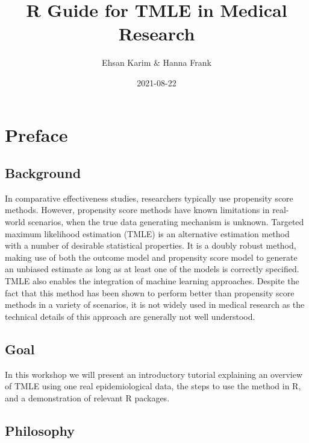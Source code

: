 \documentclass[
]{book}
\title{R Guide for TMLE in Medical Research}
\author{Ehsan Karim \& Hanna Frank}
\date{2021-08-22}
\begin{document}
\maketitle

{
\setcounter{tocdepth}{1}
\tableofcontents
}
\hypertarget{preface}{%
\chapter*{Preface}\label{preface}}

\hypertarget{background}{%
\section*{Background}\label{background}}

In comparative effectiveness studies, researchers typically use propensity score methods. However, propensity score methods have known limitations in real-world scenarios, when the true data generating mechanism is unknown. Targeted maximum likelihood estimation (TMLE) is an alternative estimation method with a number of desirable statistical properties. It is a doubly robust method, making use of both the outcome model and propensity score model to generate an unbiased estimate as long as at least one of the models is correctly specified. TMLE also enables the integration of machine learning approaches. Despite the fact that this method has been shown to perform better than propensity score methods in a variety of scenarios, it is not widely used in medical research as the technical details of this approach are generally not well understood.

\hypertarget{goal}{%
\section*{Goal}\label{goal}}

In this workshop we will present an introductory tutorial explaining an overview of TMLE using one real epidemiological data, the steps to use the method in R, and a demonstration of relevant R packages.~

\hypertarget{philosophy}{%
\section*{Philosophy}\label{philosophy}}
\end{document}
